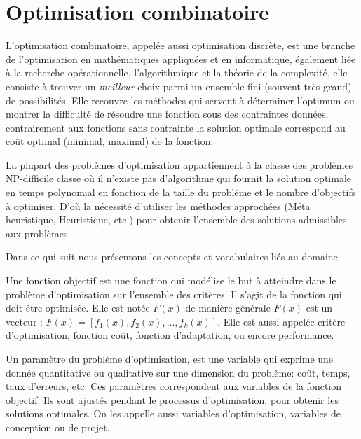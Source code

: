 
\section{Optimisation combinatoire}
	L'optimisation combinatoire, appelée  aussi optimisation discrète, est une branche de l'optimisation en mathématiques appliquées et en informatique, également liée à la recherche opérationnelle, l'algorithmique et la théorie de la complexité, elle consiste à trouver un \emph{meilleur} choix parmi un ensemble fini (souvent très grand) de possibilités. Elle recouvre les méthodes qui servent à déterminer l'optimum ou montrer la difficulté de résoudre une fonction sous des contraintes données, contrairement aux fonctions sans contrainte la solution optimale correspond au coût optimal (minimal, maximal) de la fonction.

	La plupart des problèmes d'optimisation appartiennent à la classe des problèmes NP-difficile classe où il n'existe pas d'algorithme qui fournit la solution optimale en temps polynomial en fonction de la taille du problème et le nombre d'objectifs à optimiser. D'où la nécessité d'utiliser les méthodes approchées (Méta heuristique, Heuristique, etc.) pour obtenir l'ensemble des solutions admissibles aux problèmes.
	
	
 Dans ce qui suit nous présentons les concepts et vocabulaires liés au domaine.


\begin{definition}
	Une fonction objectif est une fonction qui modélise le but à atteindre dans le problème d'optimisation sur l'ensemble des critères. Il s'agit de la fonction qui doit être optimisée. Elle est notée $F(x)$ de manière générale $F(x)$ est un vecteur :
$F(x)= [f_1(x), f_2(x),..., f_k(x)]$. Elle est aussi appelée critère d'optimisation, fonction coût, fonction d'adaptation, ou encore performance.
\end{definition}

\begin{definition}[Paramètres]
	Un paramètre du problème d'optimisation, est une variable qui exprime une donnée quantitative ou qualitative sur une dimension du problème: coût, temps, taux d'erreurs, etc. Ces paramètres correspondent aux variables de la fonction objectif. Ils sont ajustés pendant le processus d'optimisation, pour obtenir les solutions optimales. On les appelle aussi variables d'optimisation, variables de conception ou de projet.
\end{definition}

